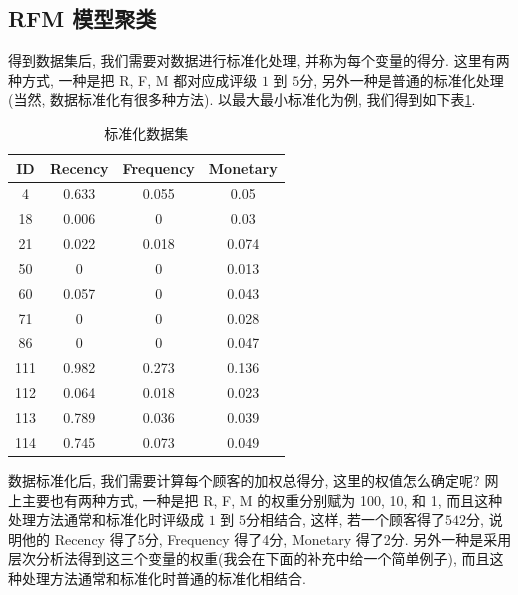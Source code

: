 \documentclass[a4paper,UTF8]{ctexart}
\theoremstyle{plain} \newtheorem{theorem}{定理}[section]
\theoremstyle{plain} \newtheorem{definition}{定义}[section]
\theoremstyle{plain} \newtheorem{lemma}{引理}[section]
\theoremstyle{plain} \newtheorem{proposition}{命题}[section]
\theoremstyle{plain} \newtheorem{example}{例}[section]
\theoremstyle{plain} \newtheorem{remark}{注}[section]
\theoremstyle{plain} \newtheorem{corollary}{推论}[section]
\begin{document}
\subsection{RFM 模型聚类}
得到数据集后, 我们需要对数据进行标准化处理, 并称为每个变量的得分. 这里有两种方式, 一种是把 R, F, M 都对应成评级 $1$ 到 $5$分, 另外一种是普通的标准化处理(当然, 数据标准化有很多种方法). 以最大最小标准化为例, 我们得到如下表\ref{scaledata}.
\begin{table}[!htb]
\centering
\caption{标准化数据集}
\label{scaledata}
\begin{tabular}{cccc}
	\hline
    \textbf{ID} & \textbf{Recency} & \textbf{Frequency} & \textbf{Monetary} \\
    \hline
	4 & 0.633 & 0.055 & 0.05 \\ 
	\hline
	18 & 0.006 & 0 & 0.03 \\ 
	\hline
	21 & 0.022 & 0.018 & 0.074 \\ 
	\hline
	50 & 0 & 0 & 0.013 \\ 
	\hline
	60 & 0.057 & 0 & 0.043 \\ 
	\hline
	71 & 0 & 0 & 0.028 \\ 
	\hline
	86 & 0 & 0 & 0.047 \\ 
	\hline
	111 & 0.982 & 0.273 & 0.136 \\ 
	\hline
	112 & 0.064 & 0.018 & 0.023 \\ 
	\hline
	113 & 0.789 & 0.036 & 0.039 \\ 
	\hline
	114 & 0.745 & 0.073 & 0.049 \\ 
	\hline
\end{tabular}
\end{table}


数据标准化后, 我们需要计算每个顾客的加权总得分, 这里的权值怎么确定呢? 网上主要也有两种方式, 一种是把 R, F, M 的权重分别赋为 100, 10, 和 1, 而且这种处理方法通常和标准化时评级成 $1$ 到 $5$分相结合, 这样, 若一个顾客得了$542$分, 说明他的 Recency 得了5分, Frequency 得了4分, Monetary 得了2分. 另外一种是采用层次分析法得到这三个变量的权重(我会在下面的补充中给一个简单例子),  而且这种处理方法通常和标准化时普通的标准化相结合.
\end{document}
